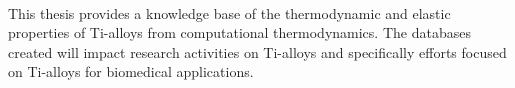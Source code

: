 \paragraph*{} This thesis provides a knowledge base of the thermodynamic and elastic properties of Ti-alloys from computational thermodynamics. The databases created will impact research activities on Ti-alloys and specifically efforts focused on Ti-alloys for biomedical applications.
